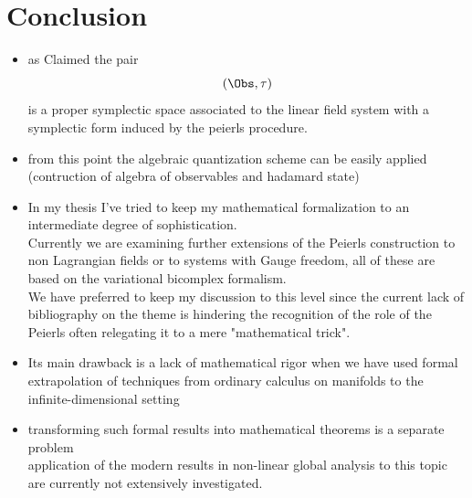 \documentclass[a4paper,11pt]{scrartcl}
\begin{document}
	\section{Conclusion}
	\begin{itemize}
		\item as Claimed the pair $$(\Obs, \tau)$$ is a proper symplectic space associated to the linear field system with a symplectic form induced by the peierls procedure.
		\item from this point the algebraic quantization scheme can be easily applied (contruction of algebra of observables and hadamard state)
		\item	In my thesis I've tried to keep my mathematical formalization to an intermediate degree of sophistication.\\
		Currently we are examining further extensions of the Peierls construction to non Lagrangian fields or to systems with Gauge freedom, all of these are based on the variational bicomplex formalism. \\
	We have preferred to keep my discussion to this level since the current lack of bibliography on the theme is hindering the recognition of the role of the Peierls often relegating it to a mere "mathematical trick".
		\item Its main drawback is a lack of mathematical rigor when we have used formal extrapolation of techniques from ordinary calculus on manifolds to the infinite-dimensional setting
		\item transforming such formal results into mathematical theorems is a separate problem\\
		application of the modern results in non-linear global analysis to this topic are currently not extensively investigated.
	\end{itemize}

	
\end{document}
